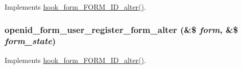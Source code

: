 Implements \hyperlink{group__hooks_ga8d4a4089551493d55911bd5c4f218264}{hook\_\-form\_\-FORM\_\-ID\_\-alter()}. \hypertarget{openid_8module_a3e72c243b50c2c5382c2ca88a9d8798f}{
\subsubsection[{openid\_\-form\_\-user\_\-register\_\-form\_\-alter}]{\setlength{\rightskip}{0pt plus 5cm}openid\_\-form\_\-user\_\-register\_\-form\_\-alter (\&\$ {\em form}, \/  \&\$ {\em form\_\-state})}}
\label{openid_8module_a3e72c243b50c2c5382c2ca88a9d8798f}
Implements \hyperlink{group__hooks_ga8d4a4089551493d55911bd5c4f218264}{hook\_\-form\_\-FORM\_\-ID\_\-alter()}.

